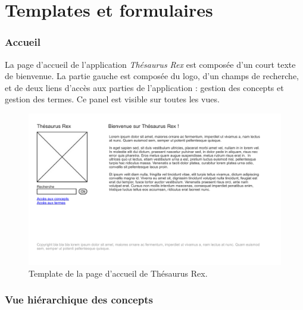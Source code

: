 	
\section{Templates et formulaires}

\subsubsection{Accueil}

La page d'accueil de l'application \emph{Thésaurus Rex} est composée d'un court texte de bienvenue. La partie gauche est composée du logo, d'un champs de recherche, et de deux liens d'accès aux parties de l'application : gestion des concepts et gestion des termes. Ce panel est visible sur toutes les vues.
\begin{figure}[H]
\begin{center}
\includegraphics[width=\textwidth]{files/template_accueil}
\end{center}
\caption{Template de la page d'accueil de Thésaurus Rex.}
\end{figure}

\subsubsection{Vue hiérarchique des concepts}

